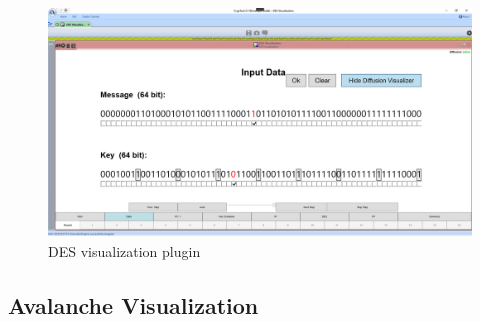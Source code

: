 \begin{figure}
\caption{DES visualization plugin}
\label{fig:des}
\centering
\includegraphics[width=\textwidth]{figures/ct2/des.png}
\end{figure}

\subsection{Avalanche Visualization}
\label{sec:avalancheVisualization}


